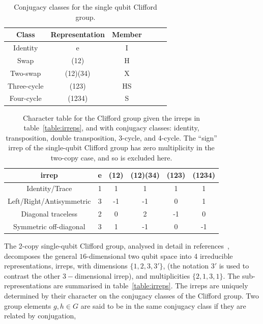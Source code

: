 \begin{table}[]
    \centering
    \begin{tabular}{c|c|c|c|c|c}
         Class & Representation & Member \\
         \hline
         Identity &e&I \\
         \hline
         Swap &(12)&H\\
         \hline
         Two-swap &(12)(34)&X\\
         \hline
         Three-cycle &(123)&HS\\
         \hline
         Four-cycle &(1234)&S\\
    \end{tabular}
    \caption{Conjugacy classes for the single qubit Clifford group.}
    \label{table:conj}
\end{table}
\begin{table}[]
    \centering
    \begin{tabular}{c|c|c|c|c|c}
         irrep & e & (12) & (12)(34) & (123) & (1234)\\
         \hline
         Identity/Trace &1&1&1&1&1 \\
         \hline
         Left/Right/Antisymmetric &3&-1&-1&0&1 \\
         \hline
         Diagonal traceless &2&0&2&-1&0 \\
         \hline
         Symmetric off-diagonal &3&1&-1&0&-1 \\
    \end{tabular}
    \caption{Character table for the Clifford group given the irreps in table~\ref{table:irreps}, and with conjugacy classes: identity, transposition, double transposition, 3-cycle, and 4-cycle. The ``sign'' irrep of the single-qubit Clifford group has zero multiplicity in the two-copy case, and so is excluded here.}
    \label{table:character}
\end{table}
The 2-copy single-qubit Clifford group, analysed in detail in references~\cite{helsen_representations_2018, wallman_randomized_2014}, decomposes
the general $16$-dimensional two qubit space into 4 irreducible representations, irreps, with dimensions $\{1,2,3,3'\}$, (the notation $3'$ is used to contrast the other $3-$dimensional irrep), and multiplicities $\{2,1,3,1\}$. The sub-representations are summarised in table~\ref{table:irreps}. 
The irreps are uniquely determined by their character on the conjugacy classes of the Clifford group. 
Two group elements $g,h\in G$ are said to be in the same conjugacy class if they are related by conjugation,
